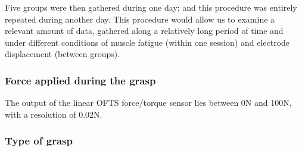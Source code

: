 Five groups were then gathered during one day; and this procedure was
entirely repeated during another day. This procedure would allow us to
examine a relevant amount of data, gathered along a relatively long
period of time and under different conditions of muscle fatigue
(within one session) and electrode displacement (between groups).

%

\subsubsection{Force applied during the grasp}

The output of the linear OFTS force/torque sensor lies between 0N
and 100N, with a resolution of $0.02$N.

\subsubsection{Type of grasp}

